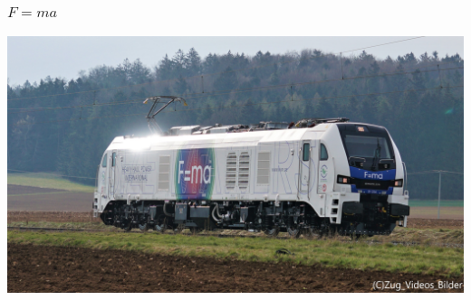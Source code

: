 %
%
%
\bgroup
\begin{frame}[t]
\setlength{\abovedisplayskip}{5pt}
\setlength{\belowdisplayskip}{5pt}
\frametitle{$F=ma$}
\begin{center}
\includegraphics[width=\textwidth]{../slides/5/eurodual.jpg}
\end{center}
\end{frame}
\egroup
